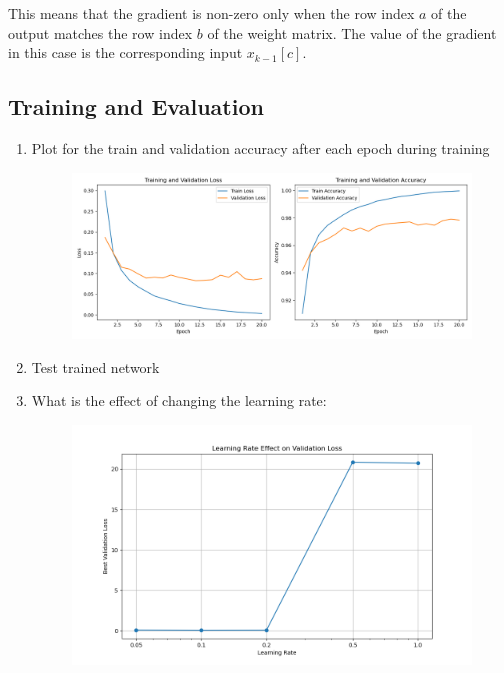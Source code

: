 \documentclass{article}
\begin{document}
\begin{enumerate}[label=\alph*)]
   This means that the gradient is non-zero only when the row index \(a\) of the output matches the row index \(b\) of the weight matrix. The value of the gradient in this case is the corresponding input \(x_{k-1}[c]\).

   \subsection*{Training and Evaluation}
   \begin{enumerate}[label=\alph*)]
      \item Plot for the train and validation accuracy after each epoch during training
      \begin{figure}[H]
         \centering
         \includegraphics[width=1\linewidth]{Train_Val_Loss_Acc.png} 
     \end{figure}
     \item Test trained network
      \item What is the effect of changing the learning rate:
      \begin{figure}[H]
         \centering
         \includegraphics[width=1\linewidth]{lr_comparison.png} 
     \end{figure}
         \begin{itemize}

\end{itemize}
\end{enumerate}
\end{enumerate}
\end{document}
